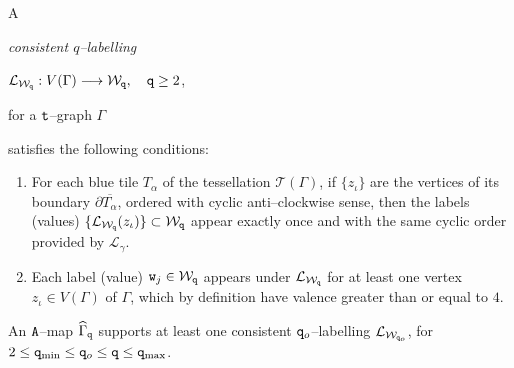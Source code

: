 \documentclass[10pt,a4paper]{amsart}
\begin{document}
\begin{definition}
\label{def:etiquetado-consistente}
A {\it consistent $q$--labelling 

\centerline{$\mathcal{L}_{\mathcal{W}_{\tt q}}: V(\Gamma) \longrightarrow \mathcal{W}_{\tt q}, 
\ \ \
{\tt q} \geq 2$, } 

\noindent 
for a ${\tt t}$--graph $\Gamma$} satisfies the following conditions:

\begin{enumerate}[label=\roman*),leftmargin=*]
\item
For each blue tile $T_\alpha$ of the tessellation
$\mathscr{T}(\Gamma)$, 
if $\{ z_\iota \}$ are the vertices of its
boundary $\partial \overline{T_\alpha}$, ordered 
with cyclic anti--clockwise sense, then the 
labels (values) $\{ \mathcal{L}_{\mathcal{W}_{\tt q}} ( z_\iota ) \} \subset \mathcal{W}_{\tt q}$
appear exactly once and with the same cyclic 
order provided by $\mathcal{L}_\gamma$.

\item
Each label (value) ${\tt w}_{j} \in \mathcal{W}_{\tt q}$ appears under
$\mathcal{L}_{\mathcal{W}_{\tt q}}$ for at least one
vertex $z_\iota \in V(\Gamma)$ of
$\Gamma$, which by definition have
valence greater than or equal to $4$.
\end{enumerate}  
\end{definition}

\begin{lemma}
\label{lem:A-mapa-admite-etiquetados}
An $\tt A$--map $\widehat{\Gamma}_{\tt q}$ supports at least one consistent 
${\tt q}_{\rm o}$--labelling $\mathcal{L}_{\mathcal{W}_{{\tt q}_{\rm o}}}$, for 
$2 \leq {\tt q}_{\text{min}} \leq {\tt q}_{\rm o} \leq {\tt q} \leq {\tt q}_{\text{max}}$.
\end{lemma}
\end{document}
